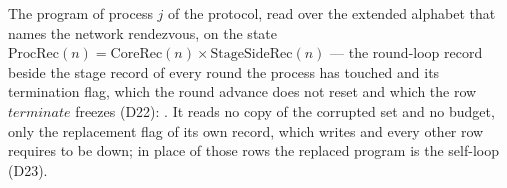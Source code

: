 \begin{definition}
  \label{def:aba-procnet}
  \leanok
  The program of process $j$ of the protocol, read over the extended alphabet that names the network rendezvous, on the state $\mathrm{ProcRec}(n) = \mathrm{CoreRec}(n) \times \mathrm{StageSideRec}(n)$ --- the round-loop record beside the stage record of every round the process has touched and its termination flag, which the round advance does not reset and which the row $terminate$ freezes (D22): .
  It reads no copy of the corrupted set and no budget, only the replacement flag  of its own record, which  writes and every other row requires to be down; in place of those rows the replaced program is the self-loop  (D23).
\end{definition}
